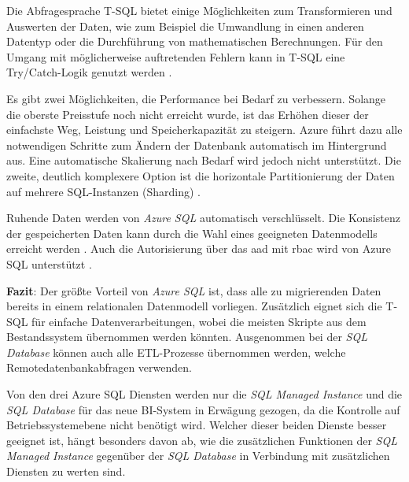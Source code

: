 Die Abfragesprache T-SQL bietet einige Möglichkeiten zum Transformieren und Auswerten der Daten, wie zum Beispiel die Umwandlung in einen anderen Datentyp oder die Durchführung von mathematischen Berechnungen. Für den Umgang mit möglicherweise auftretenden Fehlern kann in T-SQL eine Try/Catch-Logik genutzt werden \cite[vgl.][]{kellenberger_beginning_2021}.

Es gibt zwei Möglichkeiten, die Performance bei Bedarf zu verbessern. Solange die oberste Preisstufe noch nicht erreicht wurde, ist das Erhöhen dieser der einfachste Weg, Leistung und Speicherkapazität zu steigern. Azure führt dazu alle notwendigen Schritte zum Ändern der Datenbank automatisch im Hintergrund aus. Eine automatische Skalierung nach Bedarf wird jedoch nicht unterstützt. Die zweite, deutlich komplexere Option ist die horizontale Partitionierung der Daten auf mehrere SQL-Instanzen (Sharding) \cite{reagan_web_2018}.

Ruhende Daten werden von \textit{Azure SQL} automatisch verschlüsselt. Die Konsistenz der gespeicherten Daten kann durch die Wahl eines geeigneten Datenmodells erreicht werden \cite{reagan_web_2018}. Auch die Autorisierung über das \ac{aad} mit \ac{rbac} wird von Azure SQL unterstützt \cite{msdoc_21_sql_authorize}.

\textbf{Fazit}: Der größte Vorteil von \textit{Azure SQL} ist, dass alle zu migrierenden Daten bereits in einem relationalen Datenmodell vorliegen. Zusätzlich eignet sich die T-SQL für einfache Datenverarbeitungen, wobei die meisten Skripte aus dem Bestandssystem übernommen werden könnten. Ausgenommen bei der \textit{SQL Database} können auch alle ETL-Prozesse übernommen werden, welche Remotedatenbankabfragen verwenden.

Von den drei Azure SQL Diensten werden nur die \textit{SQL Managed Instance} und die \textit{SQL Database} für das neue BI-System in Erwägung gezogen, da die Kontrolle auf Betriebssystemebene nicht benötigt wird. Welcher dieser beiden Dienste besser geeignet ist, hängt besonders davon ab, wie die zusätzlichen Funktionen der \textit{SQL Managed Instance} gegenüber der \textit{SQL Database} in Verbindung mit zusätzlichen Diensten zu werten sind.


